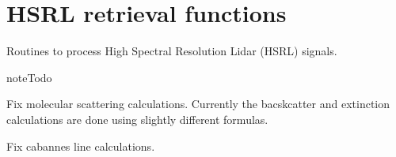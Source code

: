 \documentclass[letterpaper,10pt,english]{sphinxmanual}
\begin{document}
\chapter{HSRL retrieval functions}
\label{hsrl_retrieval:module-hsrl_retrieval}\label{hsrl_retrieval:hsrl-retrieval-functions}\label{hsrl_retrieval::doc}
Routines to process High Spectral Resolution Lidar (HSRL) signals.

\begin{notice}{note}{Todo}

Fix molecular scattering calculations. Currently the bacskcatter and extinction
calculations are done using slightly different formulas.

Fix cabannes line calculations.
\end{notice}
\end{document}
